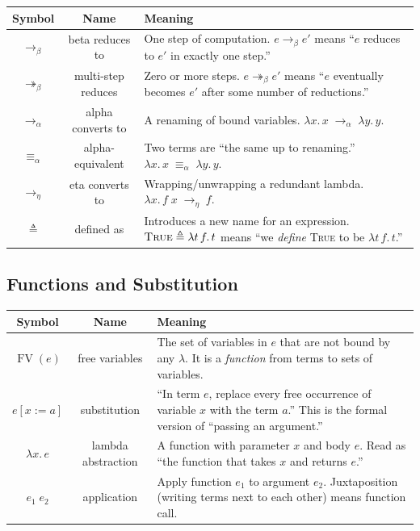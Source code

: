 \documentclass[11pt,a4paper]{article}
\theoremstyle{definition}
\newcommand{\lam}{\lambda}
\newcommand{\reduce}{\longrightarrow_\beta}
\newcommand{\reduces}{\twoheadrightarrow_\beta}
\newcommand{\af}{\longrightarrow_\alpha}
\newcommand{\ef}{\longrightarrow_\eta}
\newcommand{\aeq}{\equiv_\alpha}
\newcommand{\FV}{\operatorname{FV}}
\newcommand{\TR}{\textsc{True}}
\begin{document}
\begin{center}
\renewcommand{\arraystretch}{1.6}
\begin{tabular}{ccp{8.5cm}}
\textbf{Symbol} & \textbf{Name} & \textbf{Meaning} \\
\hline
$\longrightarrow_\beta$ & beta reduces to &
  One step of computation. $e \reduce e'$ means ``$e$ reduces to $e'$ in exactly one step.'' \\

$\twoheadrightarrow_\beta$ & multi-step reduces &
  Zero or more steps. $e \reduces e'$ means ``$e$ eventually becomes $e'$ after some number of reductions.'' \\

$\longrightarrow_\alpha$ & alpha converts to &
  A renaming of bound variables.
  $\lam x.\,x \;\af\; \lam y.\,y$. \\

$\equiv_\alpha$ & alpha-equivalent &
  Two terms are ``the same up to renaming.''
  $\lam x.\,x \;\aeq\; \lam y.\,y$. \\

$\longrightarrow_\eta$ & eta converts to &
  Wrapping/unwrapping a redundant lambda. $\lam x.\,f\;x \;\ef\; f$. \\

$\triangleq$ & defined as &
  Introduces a new name for an expression.
  $\TR \triangleq \lam t\,f.\,t$ means ``we \emph{define} \TR{} to be $\lam t\,f.\,t$.'' \\
\end{tabular}
\end{center}

\subsection{Functions and Substitution}

\begin{center}
\renewcommand{\arraystretch}{1.6}
\begin{tabular}{ccp{8.5cm}}
\textbf{Symbol} & \textbf{Name} & \textbf{Meaning} \\
\hline
$\FV(e)$ & free variables &
  The set of variables in $e$ that are not bound by any $\lam$.
  It is a \emph{function} from terms to sets of variables. \\

$e[x := a]$ & substitution &
  ``In term $e$, replace every free occurrence of variable $x$ with the term $a$.''
  This is the formal version of ``passing an argument.'' \\

$\lam x.\, e$ & lambda abstraction &
  A function with parameter $x$ and body $e$.
  Read as ``the function that takes $x$ and returns $e$.'' \\

$e_1\; e_2$ & application &
  Apply function $e_1$ to argument $e_2$.
  Juxtaposition (writing terms next to each other) means function call. \\
\end{tabular}
\end{center}
\end{document}
